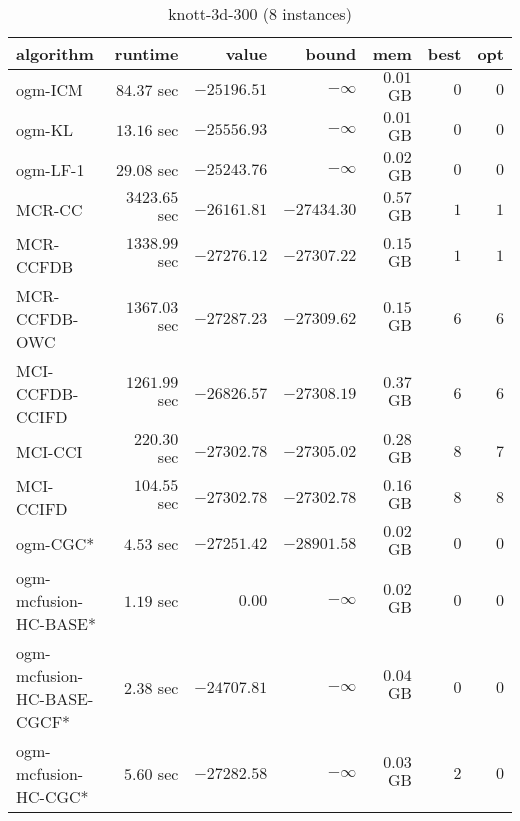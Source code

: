 \begin{table}[H]
\scriptsize
\centering
\caption{knott-3d-300 (8 instances)}
\label{tab:smalltable-knott-3d-300}
\begin{tabular}{lrrrrrr}
\toprule
           algorithm &       runtime     &         value &         bound &           mem &     best &      opt   \\ \midrule 
             ogm-ICM & $        84.37$ sec & $    -25196.51$ & $-\infty$ & $         0.01$ GB & $       0$ & $       0$ \\ 
              ogm-KL & $        13.16$ sec & $    -25556.93$ & $-\infty$ & $         0.01$ GB & $       0$ & $       0$ \\ 
            ogm-LF-1 & $        29.08$ sec & $    -25243.76$ & $-\infty$ & $         0.02$ GB & $       0$ & $       0$ \\ 
\cmidrule{1-1} 
              MCR-CC & $      3423.65$ sec & $    -26161.81$ & $    -27434.30$ & $         0.57$ GB & $       1$ & $       1$ \\ 
           MCR-CCFDB & $      1338.99$ sec & $    -27276.12$ & $    -27307.22$ & $         0.15$ GB & $       1$ & $       1$ \\ 
       MCR-CCFDB-OWC & $      1367.03$ sec & $    -27287.23$ & $    -27309.62$ & $         0.15$ GB & $       6$ & $       6$ \\ 
\cmidrule{1-1} 
     MCI-CCFDB-CCIFD & $      1261.99$ sec & $    -26826.57$ & $    -27308.19$ & $         0.37$ GB & $       6$ & $       6$ \\ 
             MCI-CCI & $       220.30$ sec & $    -27302.78$ & $    -27305.02$ & $         0.28$ GB & $       8$ & $       7$ \\ 
           MCI-CCIFD & $       104.55$ sec & $    -27302.78$ & $    -27302.78$ & $         0.16$ GB & $       8$ & $       8$ \\ 
\cmidrule{1-1} 
            ogm-CGC* & $         4.53$ sec & $    -27251.42$ & $    -28901.58$ & $         0.02$ GB & $       0$ & $       0$ \\ 
ogm-mcfusion-HC-BASE* & $         1.19$ sec & $         0.00$ & $-\infty$ & $         0.02$ GB & $       0$ & $       0$ \\ 
ogm-mcfusion-HC-BASE-CGCF* & $         2.38$ sec & $    -24707.81$ & $-\infty$ & $         0.04$ GB & $       0$ & $       0$ \\ 
ogm-mcfusion-HC-CGC* & $         5.60$ sec & $    -27282.58$ & $-\infty$ & $         0.03$ GB & $       2$ & $       0$ \\ 

\end{tabular}
\end{table}
